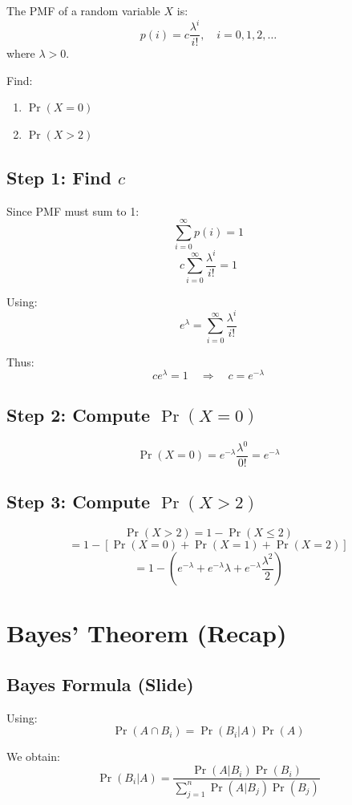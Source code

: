 \documentclass[11pt]{article}
\begin{document}
The PMF of a random variable \( X \) is:
\[
p(i) = c \frac{\lambda^i}{i!}, \quad i = 0,1,2,\ldots
\]
where \( \lambda > 0 \).

Find:
\begin{enumerate}
    \item \( \Pr(X=0) \)
    \item \( \Pr(X>2) \)
\end{enumerate}

\subsection*{Step 1: Find \( c \)}

Since PMF must sum to 1:
\[
\sum_{i=0}^{\infty} p(i) = 1
\]
\[
c \sum_{i=0}^{\infty} \frac{\lambda^i}{i!} = 1
\]

Using:
\[
e^{\lambda} = \sum_{i=0}^{\infty} \frac{\lambda^i}{i!}
\]

Thus:
\[
c e^{\lambda} = 1
\quad \Rightarrow \quad
c = e^{-\lambda}
\]

\subsection*{Step 2: Compute \( \Pr(X=0) \)}

\[
\Pr(X=0) = e^{-\lambda} \frac{\lambda^0}{0!} = e^{-\lambda}
\]

\subsection*{Step 3: Compute \( \Pr(X>2) \)}

\[
\Pr(X>2) = 1 - \Pr(X \le 2)
\]
\[
= 1 - [\Pr(X=0) + \Pr(X=1) + \Pr(X=2)]
\]
\[
= 1 - \left(
e^{-\lambda}
+ e^{-\lambda}\lambda
+ e^{-\lambda}\frac{\lambda^2}{2}
\right)
\]

\vspace{1em}

\section{Bayes’ Theorem (Recap)}

\subsection*{Bayes Formula (Slide)}

Using:
\[
\Pr(A \cap B_i) = \Pr(B_i|A)\Pr(A)
\]

We obtain:
\[
\Pr(B_i|A)
=
\frac{\Pr(A|B_i)\Pr(B_i)}
{\sum_{j=1}^{n} \Pr(A|B_j)\Pr(B_j)}
\]
\end{document}
